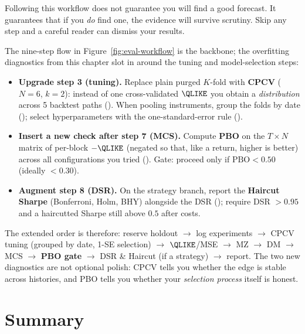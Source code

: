 \begin{keyidea}
Following this workflow does not guarantee you will find a good forecast.
It guarantees that if you \emph{do} find one, the evidence will survive scrutiny.
Skip any step and a careful reader can dismiss your results.
\end{keyidea}



\begin{keyidea}
The nine-step flow in Figure~\ref{fig:eval-workflow} is the backbone; the overfitting diagnostics from this chapter slot in around the tuning and model-selection steps:
\begin{itemize}[nosep]
  \item \textbf{Upgrade step 3 (tuning).} Replace plain purged $K$-fold with \textbf{CPCV} ($N=6$, $k=2$): instead of one cross-validated $\QLIKE$ you obtain a \emph{distribution} across 5 backtest paths (). When pooling instruments, group the folds by date (); select hyperparameters with the one-standard-error rule ().
  \item \textbf{Insert a new check after step 7 (MCS).} Compute \textbf{PBO} on the $T \times N$ matrix of per-block $-\QLIKE$ (negated so that, like a return, higher is better) across all configurations you tried (). Gate: proceed only if $\text{PBO} < 0.50$ (ideally $< 0.30$).
  \item \textbf{Augment step 8 (DSR).} On the strategy branch, report the \textbf{Haircut Sharpe} (Bonferroni, Holm, BHY) alongside the DSR (); require DSR $> 0.95$ and a haircutted Sharpe still above $0.5$ after costs.
\end{itemize}
The extended order is therefore: reserve holdout $\rightarrow$ log experiments $\rightarrow$ CPCV tuning (grouped by date, 1-SE selection) $\rightarrow$ $\QLIKE$/MSE $\rightarrow$ MZ $\rightarrow$ DM $\rightarrow$ MCS $\rightarrow$ \textbf{PBO gate} $\rightarrow$ DSR \& Haircut (if a strategy) $\rightarrow$ report. The two new diagnostics are not optional polish: CPCV tells you whether the edge is stable across histories, and PBO tells you whether your \emph{selection process} itself is honest.
\end{keyidea}


\section{Summary}
\label{sec:eval-summary}

